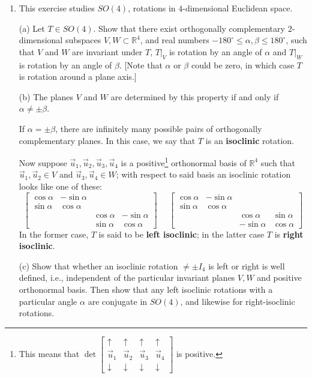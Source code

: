 \documentclass[leqno]{book}
\begin{document}
\begin{enumerate}
\item This exercise studies $SO(4)$, rotations in $4$-dimensional Euclidean space.

(a) Let $T\in SO(4)$.  Show that there exist orthogonally complementary $2$-dimensional subspaces $V,W\subset\mathbb R^4$, and real numbers $-180^\circ\leqslant\alpha,\beta\leqslant 180^\circ$, such that $V$ and $W$ are invariant under $T$, $T|_V$ is rotation by an angle of $\alpha$ and $T|_W$ is rotation by an angle of $\beta$.  [Note that $\alpha$ or $\beta$ could be zero, in which case $T$ is rotation around a plane axis.]

(b) The planes $V$ and $W$ are determined by this property if and only if $\alpha\ne\pm\beta$.

If $\alpha=\pm\beta$, there are infinitely many possible pairs of orthogonally complementary planes.  In this case, we say that $T$ is an \textbf{isoclinic} rotation.

Now suppose $\vec u_1,\vec u_2,\vec u_3,\vec u_4$ is a positive\footnote{This means that $\det\begin{bmatrix}\uparrow&\uparrow&\uparrow&\uparrow\\\vec u_1&\vec u_2&\vec u_3&\vec u_4\\\downarrow&\downarrow&\downarrow&\downarrow\end{bmatrix}$ is positive.} orthonormal basis of $\mathbb R^4$ such that $\vec u_1,\vec u_2\in V$ and $\vec u_3,\vec u_4\in W$; with respect to said basis an isoclinic rotation looks like one of these:
$$\begin{bmatrix}\cos\alpha&-\sin\alpha\\\sin\alpha&\cos\alpha\\&&\cos\alpha&-\sin\alpha\\&&\sin\alpha&\cos\alpha\end{bmatrix}~~~~~~\begin{bmatrix}\cos\alpha&-\sin\alpha\\\sin\alpha&\cos\alpha\\&&\cos\alpha&\sin\alpha\\&&-\sin\alpha&\cos\alpha\end{bmatrix}$$
In the former case, $T$ is said to be \textbf{left isoclinic}; in the latter case $T$ is \textbf{right isoclinic}.

(c) Show that whether an isoclinic rotation $\ne\pm I_4$ is left or right is well defined, i.e., independent of the particular invariant planes $V,W$ and positive orthonormal basis.  Then show that any left isoclinic rotations with a particular angle $\alpha$ are conjugate in $SO(4)$, and likewise for right-isoclinic rotations.


\end{enumerate}
\end{document}

